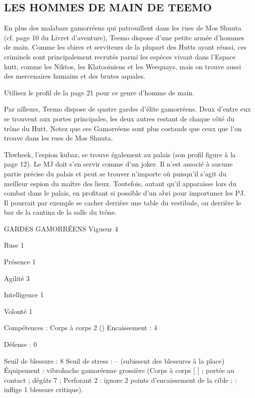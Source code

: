 \documentclass[a4paper,10pt,twoside,twocolumn,openany]{book}
\begin{document}
\subsection{LES HOMMES DE
MAIN DE TEEMO}
En plus des malabars gamorréens qui patrouillent dans
les rues de Mos Shuuta (cf. page 10 du Livret d’aventure),
Teemo dispose d’une petite armée d’hommes de main.
Comme les sbires et serviteurs de la plupart des Hutts
ayant réussi, ces criminels sont principalement recrutés
parmi les espèces vivant dans l’Espace hutt, comme les
Niktos, les Klatooiniens et les Weequays, mais on trouve
aussi des mercenaires humains et des brutes aquales.

Utilisez le profil de la page 21 pour ce genre d’homme
de main.

Par ailleurs, Teemo dispose de quatre gardes d’élite gamorréens. Deux d’entre eux se trouvent aux portes principales, les deux autres restant de chaque côté du trône du
Hutt. Notez que ces Gamorréens sont plus costauds que
ceux que l’on trouve dans les rues de Mos Shuuta.

Thwheek, l’espion kubaz, se trouve également au palais (son profil figure à la page 12). Le MJ doit s’en servir
comme d’un joker. Il n’est associé à aucune partie précise
du palais et peut se trouver n’importe où puisqu’il s’agit
du meilleur espion du maître des lieux. Toutefois, autant
qu’il apparaisse lors du combat dans le palais, en profitant
si possible d’un abri pour importuner les PJ. Il pourrait
par exemple se cacher derrière une table du vestibule, ou
derrière le bar de la cantina de la salle du trône.

\begin{monsterbox}
  

GARDES GAMORRÉENS
Vigueur 4

Ruse 1

Présence 1

Agilité 3

Intelligence 1

Volonté 1

Compétences : Corps à corps 2 (\difficulty \difficulty \proficiency \proficiency)
Encaissement : 4

Défense : 0

Seuil de blessure : 8
Seuil de stress : – (subissent des blessures à la
place)
Équipement : vibrohache gamoréenne grossière
(Corps à corps [ \difficulty \difficulty \proficiency \proficiency ] ; portée au contact ;
dégâts 7 ; Perforant 2 : ignore 2 points d’encaissement de la cible ; \advantage \advantage : inflige 1 blessure critique).
\end{monsterbox}
\end{document}
